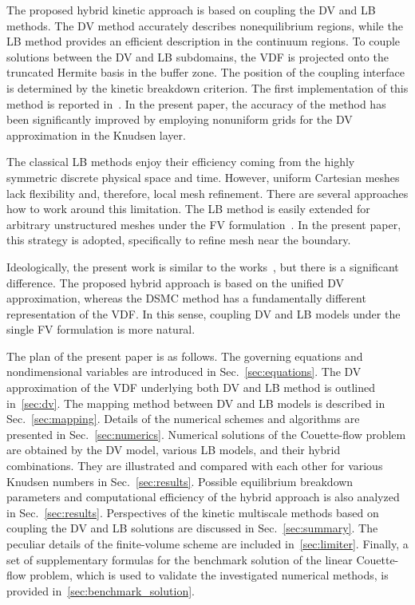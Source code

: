 \documentclass{elsarticle} %
\begin{document}
The proposed hybrid kinetic approach is based on coupling the DV and LB methods.
The DV method accurately describes nonequilibrium regions,
while the LB method provides an efficient description in the continuum regions.
To couple solutions between the DV and LB subdomains,
the VDF is projected onto the truncated Hermite basis in the buffer zone.
The position of the coupling interface is determined by the kinetic breakdown criterion.
The first implementation of this method is reported in~\cite{Aristov2019}.
In the present paper, the accuracy of the method has been significantly improved
by employing nonuniform grids for the DV approximation in the Knudsen layer.

The classical LB methods enjoy their efficiency coming from the highly symmetric discrete physical space and time.
However, uniform Cartesian meshes lack flexibility and, therefore, local mesh refinement.
There are several approaches how to work around this limitation.
The LB method is easily extended for arbitrary unstructured meshes
under the FV formulation~\cite{Succi1992, Peng1999, Patil2009, Li2016}.
In the present paper, this strategy is adopted, specifically to refine mesh near the boundary.

Ideologically, the present work is similar to the works~\cite{Staso2016long, Staso2018},
but there is a significant difference.
The proposed hybrid approach is based on the unified DV approximation,
whereas the DSMC method has a fundamentally different representation of the VDF.
In this sense, coupling DV and LB models under the single FV formulation is more natural.

The plan of the present paper is as follows.
The governing equations and nondimensional variables are introduced in Sec.~\ref{sec:equations}.
The DV approximation of the VDF underlying both DV and LB method is outlined in~\ref{sec:dv}.
The mapping method between DV and LB models is described in Sec.~\ref{sec:mapping}.
Details of the numerical schemes and algorithms are presented in Sec.~\ref{sec:numerics}.
Numerical solutions of the Couette-flow problem are obtained by the DV model,
various LB models, and their hybrid combinations.
They are illustrated and compared with each other for various Knudsen numbers in Sec.~\ref{sec:results}.
Possible equilibrium breakdown parameters and computational efficiency of the hybrid approach
is also analyzed in Sec.~\ref{sec:results}.
Perspectives of the kinetic multiscale methods based on coupling the DV and LB solutions
are discussed in Sec.~\ref{sec:summary}.
The peculiar details of the finite-volume scheme are included in~\ref{sec:limiter}.
Finally, a set of supplementary formulas for the benchmark solution of the linear Couette-flow problem,
which is used to validate the investigated numerical methods, is provided in~\ref{sec:benchmark_solution}.
\end{document}
